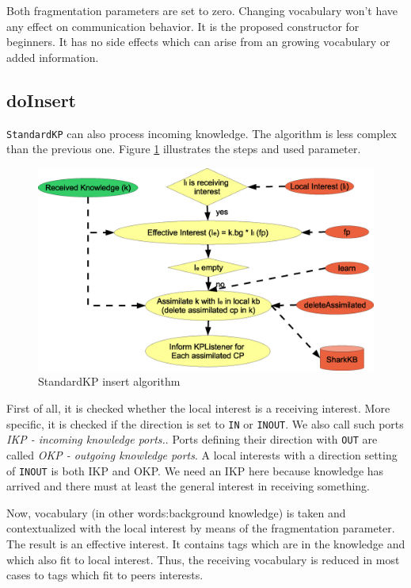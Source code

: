 {Both fragmentation parameters are set to zero. Changing vocabulary won't have any effect on communication behavior. It is the proposed constructor for beginners. It has no side effects which can arise from an growing vocabulary or added information.

\subsection{doInsert}
{\tt StandardKP} can also process incoming knowledge. The algorithm is less complex than the previous one. Figure \ref{fig:StandardKP_insert} illustrates the steps and used parameter.

\begin{figure}[t]
\centering
\includegraphics[width=1.00\textwidth]{StandardKP_Insert.eps}
\caption{StandardKP insert algorithm}
\label{fig:StandardKP_insert}
\end{figure}

First of all, it is checked whether the local interest is a receiving interest. More specific, it is checked if the direction is set to {\tt IN} or {\tt INOUT}. We also call such ports {\it IKP - incoming knowledge ports.}. Ports defining their direction with {\tt OUT} are called {\it OKP - outgoing knowledge ports}. A local interests with a direction setting of {\tt INOUT} is both IKP and OKP.
We need an IKP here because knowledge has arrived and there must at least the general interest in receiving something.

Now, vocabulary (in other words:background knowledge) is taken and contextualized with the local interest by means of the fragmentation parameter.
The result is an {effective interest}. It contains tags which are in the knowledge and which also fit to local interest. Thus, the receiving vocabulary is reduced in most cases to tags which fit to peers interests.

}
